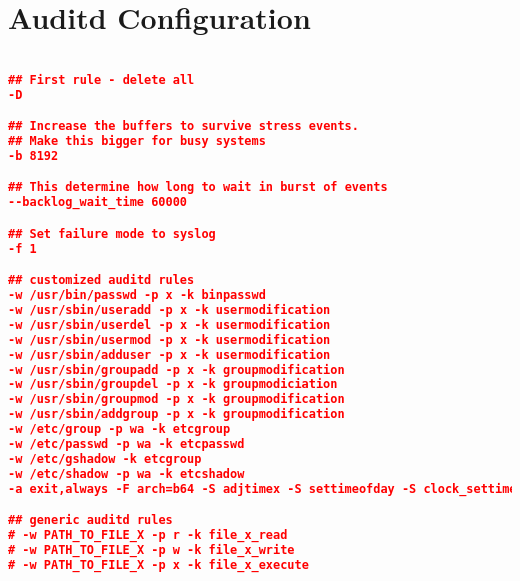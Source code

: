 
%
%

\section*{Auditd Configuration}
%
\label{appendix:auditdconfiguration}

\begin{lstlisting}[language=json,firstnumber=1]

## First rule - delete all
-D

## Increase the buffers to survive stress events.
## Make this bigger for busy systems
-b 8192

## This determine how long to wait in burst of events
--backlog_wait_time 60000

## Set failure mode to syslog
-f 1

## customized auditd rules
-w /usr/bin/passwd -p x -k binpasswd
-w /usr/sbin/useradd -p x -k usermodification
-w /usr/sbin/userdel -p x -k usermodification
-w /usr/sbin/usermod -p x -k usermodification
-w /usr/sbin/adduser -p x -k usermodification
-w /usr/sbin/groupadd -p x -k groupmodification
-w /usr/sbin/groupdel -p x -k groupmodiciation
-w /usr/sbin/groupmod -p x -k groupmodification
-w /usr/sbin/addgroup -p x -k groupmodification
-w /etc/group -p wa -k etcgroup
-w /etc/passwd -p wa -k etcpasswd
-w /etc/gshadow -k etcgroup
-w /etc/shadow -p wa -k etcshadow
-a exit,always -F arch=b64 -S adjtimex -S settimeofday -S clock_settime -k timechange

## generic auditd rules
# -w PATH_TO_FILE_X -p r -k file_x_read
# -w PATH_TO_FILE_X -p w -k file_x_write
# -w PATH_TO_FILE_X -p x -k file_x_execute

\end{lstlisting}

\pagebreak

